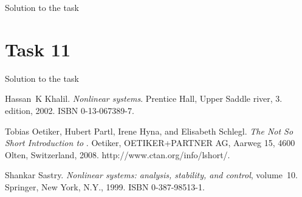\documentclass[a4paper,12pt,oneside,onecolumn]{article} %
\begin{document}
Solution to the task

\section*{Task 11}

Solution to the task


\begin{thebibliography}{99}
Hassan~K Khalil.
\newblock \emph{Nonlinear systems}.
\newblock Prentice Hall, Upper Saddle river, 3. edition, 2002.
\newblock ISBN 0-13-067389-7.

Tobias Oetiker, Hubert Partl, Irene Hyna, and Elisabeth Schlegl.
\newblock \emph{The Not So Short Introduction to \LaTeXe}.
\newblock Oetiker, OETIKER+PARTNER AG, Aarweg 15, 4600 Olten, Switzerland,
  2008.
\newblock http://www.ctan.org/info/lshort/.

Shankar Sastry.
\newblock \emph{Nonlinear systems: analysis, stability, and control},
  volume~10.
\newblock Springer, New York, N.Y., 1999.
\newblock ISBN 0-387-98513-1.
\end{thebibliography}
\end{document}

